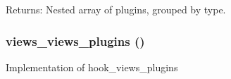 \begin{Desc}
\item[Returns:]Nested array of plugins, grouped by type. \end{Desc}
\hypertarget{plugins_8inc_89b4d3bd8e15dca9a33e85b203218b8d}{
\subsubsection[{views\_\-views\_\-plugins}]{\setlength{\rightskip}{0pt plus 5cm}views\_\-views\_\-plugins ()}}
\label{plugins_8inc_89b4d3bd8e15dca9a33e85b203218b8d}


Implementation of hook\_\-views\_\-plugins 